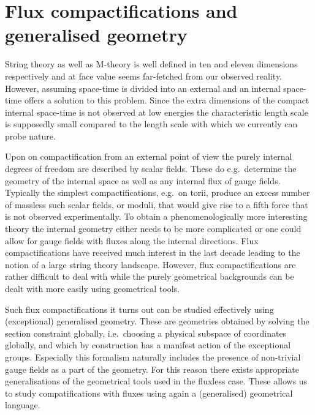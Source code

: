 \section{Flux compactifications and generalised geometry}
String theory as well as M-theory is well defined in ten and eleven dimensions respectively and at face value seems far-fetched from our observed reality. However, assuming space-time is divided into an external and an internal space-time offers a solution to this problem. Since the extra dimensions of the compact internal space-time is not observed at low energies the characteristic length scale is supposedly small compared to the length scale with which we currently can probe nature.

Upon on compactification from an external point of view the purely internal degrees of freedom are described by scalar fields. These do e.g.\ determine the geometry of the internal space as well as any internal flux of gauge fields. Typically the simplest compactifications, e.g.\ on torii, produce an excess number of massless such scalar fields, or moduli, that would give rise to a fifth force that is not observed experimentally. To obtain a phenomenologically more interesting theory the internal geometry either needs to be more complicated or one could allow for gauge fields with fluxes along the internal directions. Flux compactifications \cite{Grana:2005jc} have received much interest in the last decade leading to the notion of a large string theory landscape. However, flux compactifications are rather difficult to deal with while the purely geometrical backgrounds can be dealt with more easily using geometrical tools. 

Such flux compactifications it turns out can be studied effectively using (exceptional) generalised geometry. These are geometries obtained by solving the section constraint globally, i.e.\ choosing a physical subspace of coordinates globally, and which by construction has a manifest action of the exceptional groups. Especially this formalism naturally includes the presence of non-trivial gauge fields as a part of the geometry. For this reason there exists appropriate generalisations of the geometrical tools used in the fluxless case. These allows us to study compatifications with fluxes using again a (generalised) geometrical language.\cite{Grana:2009im,Grana:2016dyl,Coimbra:2012af,Ashmore:2015joa}


